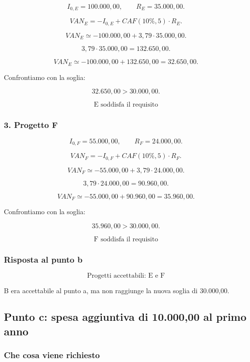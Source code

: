 \[
I_{0,E}=100.000{,}00,
\qquad
R_E=35.000{,}00.
\]

\[
VAN_E
=
-I_{0,E}+CAF(10\%,5)\cdot R_E.
\]

\[
VAN_E
\simeq
-100.000{,}00+3{,}79\cdot35.000{,}00.
\]

\[
3{,}79\cdot35.000{,}00
=
132.650{,}00.
\]

\[
VAN_E
\simeq
-100.000{,}00+132.650{,}00
=
\boxed{32.650{,}00}.
\]

\noindent Confrontiamo con la soglia:

\[
32.650{,}00>30.000{,}00.
\]

\[
\boxed{
\text{E soddisfa il requisito}
}
\]


\subsubsection*{3. Progetto F}

\[
I_{0,F}=55.000{,}00,
\qquad
R_F=24.000{,}00.
\]

\[
VAN_F
=
-I_{0,F}+CAF(10\%,5)\cdot R_F.
\]

\[
VAN_F
\simeq
-55.000{,}00+3{,}79\cdot24.000{,}00.
\]

\[
3{,}79\cdot24.000{,}00
=
90.960{,}00.
\]

\[
VAN_F
\simeq
-55.000{,}00+90.960{,}00
=
\boxed{35.960{,}00}.
\]

\noindent Confrontiamo con la soglia:

\[
35.960{,}00>30.000{,}00.
\]

\[
\boxed{
\text{F soddisfa il requisito}
}
\]


\subsubsection*{Risposta al punto b}

\[
\boxed{
\text{Progetti accettabili: E e F}
}
\]

\noindent B era accettabile al punto a,
ma non raggiunge
la nuova soglia di 30.000,00.


\subsection{Punto c:
spesa aggiuntiva di 10.000,00 al primo anno}

\subsubsection*{Che cosa viene richiesto}

